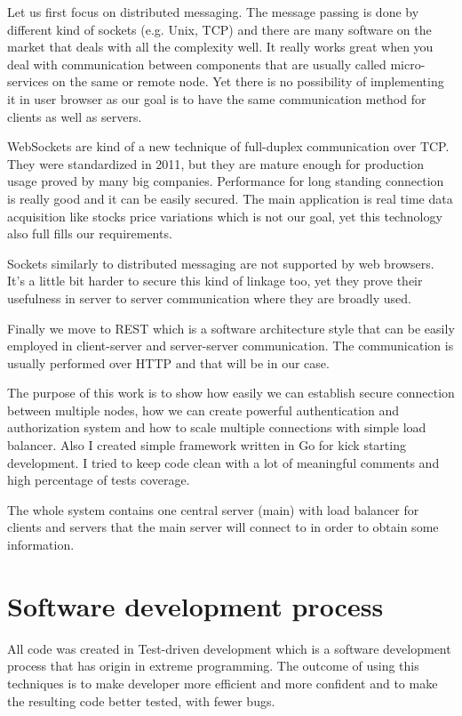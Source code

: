 Let us first focus on distributed messaging. The message passing is done by
different kind of sockets (e.g. Unix, TCP) and there are many software on the
market that deals with all the complexity well. It really works great when you
deal with communication between components that are usually called
micro-services on the same or remote node. Yet there is no possibility of
implementing it in user browser as our goal is to have the same communication
method for clients as well as servers.

WebSockets are kind of a new technique of full-duplex communication over TCP\@.
They were standardized in 2011\cite{WebSockets-wiki}, but they are mature
enough for production usage proved by many big companies. Performance for long
standing connection is really good and it can be easily secured. The main
application is real time data acquisition like stocks price variations which is
not our goal, yet this technology also full fills our requirements.

Sockets similarly to distributed messaging are not supported by web browsers.
It's a little bit harder to secure this kind of linkage too, yet they prove
their usefulness in server to server communication where they are broadly used.

Finally we move to REST which is a software architecture style that can be
easily employed in client-server and server-server communication. The
communication is usually performed over HTTP and that will be in our case.

The purpose of this work is to show how easily we can establish secure
connection between multiple nodes, how we can create powerful authentication
and authorization system and how to scale multiple connections with simple load
balancer. Also I created simple framework written in Go for kick starting
development. I tried to keep code clean with a lot of meaningful comments and
high percentage of tests coverage.

The whole system contains one central server (main) with load balancer for
clients and servers that the main server will connect to in order to obtain
some information.


\section{Software development process}
All code was created in Test-driven development which is a software development
process\cite{TDD} that has origin in extreme programming. The outcome of using
this techniques is to make developer more efficient and more confident and to
make the resulting code better tested, with fewer bugs.

